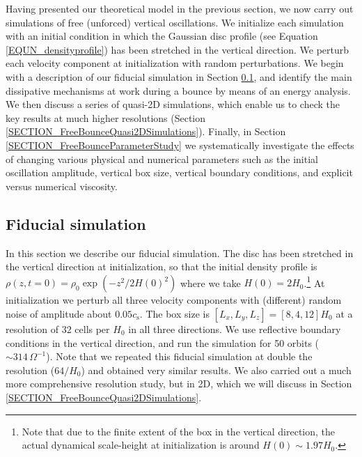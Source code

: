 \documentclass[fleqn,usenatbib]{mnras}
\begin{document}
Having presented our theoretical model in the previous section, we now carry out simulations of free (unforced) vertical oscillations. We initialize each simulation with an initial condition in which the Gaussian disc profile (see Equation \ref{EQUN_densityprofile}) has been stretched in the vertical direction. We perturb each velocity component at initialization with random perturbations. We begin with a description of our fiducial simulation in Section \ref{SECTION_FreeBounceFiducialSimulation}, and identify the main dissipative mechanisms at work during a bounce by means of an energy analysis. We then discuss a series of quasi-2D simulations, which enable us to check the key results at much higher resolutions (Section \ref{SECTION_FreeBounceQuasi2DSimulations}). Finally, in Section \ref{SECTION_FreeBounceParameterStudy} we systematically investigate the effects of changing various physical and numerical parameters such as the initial oscillation amplitude, vertical box size, vertical boundary conditions, and explicit versus numerical viscosity. 

\subsection{Fiducial simulation}
\label{SECTION_FreeBounceFiducialSimulation}
In this section we describe our fiducial simulation. The disc has been stretched in the vertical direction at initialization, so that the initial density profile is $\rho(z,t=0) = \rho_0 \exp(-z^2/2H(0)^2)$ where we take $H(0) = 2H_0$.\footnote{Note that due to the finite extent of the box in the vertical direction, the actual dynamical scale-height at initialization is around $H(0) \sim 1.97H_0$.} At initialization we perturb all three velocity components with (different) random noise of amplitude about $0.05 c_\text{s}$. The box size is $[L_x,L_y,L_z] = [8,4,12]H_0$ at a resolution of $32$ cells per $H_0$ in all three directions. We use reflective boundary conditions in the vertical direction, and run the simulation for 50 orbits ($\sim 314\,\Omega^{-1}$). Note that we repeated this fiducial simulation at double the resolution ($64/H_0$) and obtained very similar results. We also carried out a much more comprehensive resolution study, but in 2D, which we will discuss in Section \ref{SECTION_FreeBounceQuasi2DSimulations}. 
\end{document}
